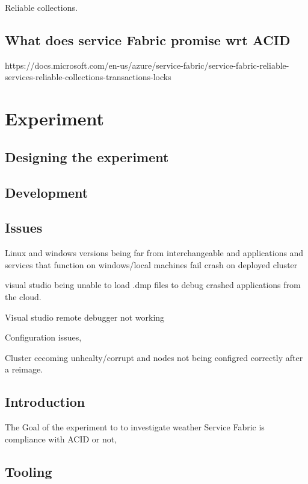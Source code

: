 \documentclass[a4paper,10pt,titlepage]{report}
\begin{document}
Reliable collections.

\subsection{What does service Fabric promise wrt ACID}

https://docs.microsoft.com/en-us/azure/service-fabric/service-fabric-reliable-services-reliable-collections-transactions-locks


\section{Experiment}

\subsection{Designing the experiment}

\subsection{Development}

\subsection{Issues}

Linux and windows versions being far from interchangeable and applications and services that function on windows/local machines fail crash on deployed cluster

visual studio being unable to load .dmp files to debug crashed applications from the cloud.

Visual studio remote debugger not working


Configuration issues,

Cluster cecoming unhealty/corrupt and nodes not being configred correctly after a reimage.

\subsection{Introduction}

The Goal of the experiment to to investigate weather Service Fabric is compliance with ACID or not,


\subsection{Tooling}
\end{document}

